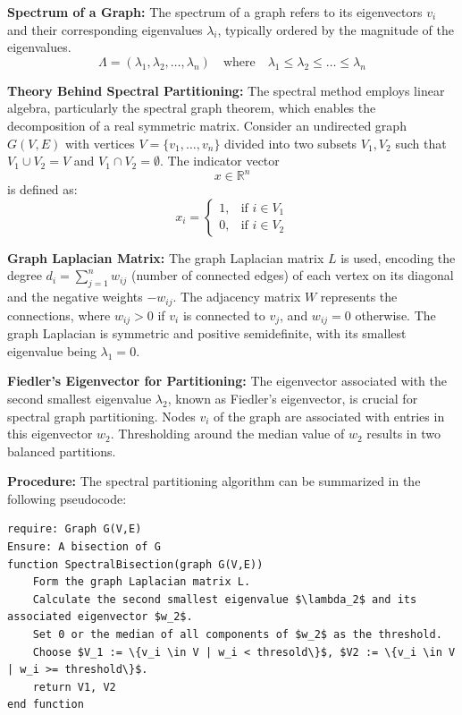 \documentclass[unicode,11pt,a4paper,oneside,numbers=endperiod,openany]{scrartcl}
\begin{document}
\textbf{Spectrum of a Graph:}
The spectrum of a graph refers to its eigenvectors \( v_i \) and their corresponding eigenvalues \( \lambda_i \), typically ordered by the magnitude of the eigenvalues.
\begin{equation}
    \Lambda = (\lambda_1, \lambda_2, \ldots , \lambda_n) \quad \text{where} \quad \lambda_1 \leq \lambda_2 \leq \ldots \leq \lambda_n
\end{equation}

\textbf{Theory Behind Spectral Partitioning:}
The spectral method employs linear algebra, particularly the spectral graph theorem, which enables the decomposition of a real symmetric matrix. Consider an undirected graph \( G(V, E) \) with vertices \( V = \{v_1, \ldots, v_n\} \) divided into two subsets \( V_1, V_2 \) such that \( V_1 \cup V_2 = V \) and \( V_1 \cap V_2 = \emptyset \). The indicator vector \[ x \in \mathbb{R}^n \] is defined as:
\begin{equation}
    x_i =
        \begin{cases}
         1, & \text{if } i \in V_1 \\
         0, & \text{if } i \in V_2
        \end{cases}
\end{equation}

\textbf{Graph Laplacian Matrix:}
The graph Laplacian matrix \( L \) is used, encoding the degree \( d_i = \sum^{n}_{j=1} w_{ij} \) (number of connected edges) of each vertex on its diagonal and the negative weights \(-w_{ij}\). The adjacency matrix \( W \) represents the connections, where \( w_{ij} > 0 \) if \( v_i \) is connected to \( v_j \), and \( w_{ij} = 0 \) otherwise. The graph Laplacian is symmetric and positive semidefinite, with its smallest eigenvalue being \( \lambda_1 = 0 \).

\textbf{Fiedler's Eigenvector for Partitioning:}
The eigenvector associated with the second smallest eigenvalue \( \lambda_2 \), known as Fiedler's eigenvector, is crucial for spectral graph partitioning. Nodes \( v_i \) of the graph are associated with entries in this eigenvector \( w_2 \). Thresholding around the median value of \( w_2 \) results in two balanced partitions.

\textbf{Procedure:}
The spectral partitioning algorithm can be summarized in the following pseudocode:

\begin{lstlisting}
require: Graph G(V,E)
Ensure: A bisection of G
function SpectralBisection(graph G(V,E))
    Form the graph Laplacian matrix L.
    Calculate the second smallest eigenvalue $\lambda_2$ and its associated eigenvector $w_2$.
    Set 0 or the median of all components of $w_2$ as the threshold.
    Choose $V_1 := \{v_i \in V | w_i < thresold\}$, $V2 := \{v_i \in V | w_i >= threshold\}$.
    return V1, V2
end function
\end{lstlisting}
\end{document}
